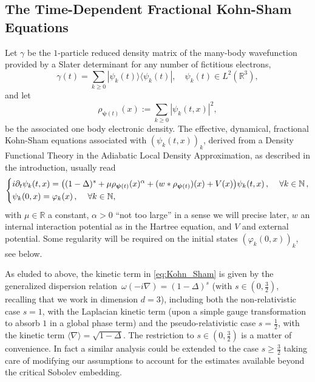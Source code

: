 \documentclass[12pt,a4paper]{amsart}
\numberwithin{equation}{section}
\newcommand{\ulpsi}{\boldsymbol{\psi}}
\begin{document}
	
	\subsection{The Time-Dependent Fractional Kohn-Sham Equations}
	
	Let $\gamma$  be the $1$-particle reduced density matrix of the many-body wavefunction provided by a Slater determinant for any number of fictitious electrons,
	\begin{equation}\label{def:density_matrix}
		\gamma(t) = \sum_{k \geq 0} | \psi_k(t) \rangle \langle \psi_k(t) | , \;\ \;\ \psi_k (t) \in L^2(\mathbb{R}^3),
	\end{equation}
	and let  %
	\begin{equation}\label{def:density}
		\rho_{\ulpsi(t)}(x) := \sum_{k \geq 0} | \psi_{k}(t,x) |^2 ,
	\end{equation}
	be the associated one body electronic density. The effective, dynamical, fractional Kohn-Sham equations associated with $(\psi_k(t,x))_k$, derived from a Density Functional Theory in the Adiabatic Local Density Approximation, as described in the introduction, usually read
	\begin{equation}
		\label{eq:Kohn_Sham}
		\begin{dcases}
			i \partial_t \psi_{k}(t,x) = \big((1- \Delta)^s  + \mu \rho_{\ulpsi(t)}(x)^\alpha +(w*\rho_{\ulpsi(t)})(x) +V(x)\big) \psi_{k}(t,x) \, , \quad \, \forall k \in \mathbb{N}\, ,\\
			\psi_k(0,x) = \varphi_k(x)\,,\, \quad\forall k \in \mathbb{N},
		\end{dcases}
	\end{equation}
	with $\mu\in\mathbb{R}$ a constant, $\alpha>0$ ``not too large'' in a sense we will precise later, $w$ an internal interaction potential as in the Hartree equation, and $V$ and external potential. Some regularity will be required on the initial states $(\varphi_k(0,x))_k$, see below.
	
	As eluded to above, the kinetic term in \eqref{eq:Kohn_Sham} is given by the generalized dispersion relation~$ \omega(-i \nabla) = (1-\Delta)^{s} $ (with $s\in(0,\frac{3}{2})$, recalling that we work in dimension $d=3$), including both the non-relativistic case $s=1$, with the Laplacian kinetic term (upon a simple gauge transformation to absorb $1$ in a global phase term) and the pseudo-relativistic case $s=\frac12$, with the kinetic term $ \langle \nabla \rangle =\sqrt{1-\Delta}$. The restriction to $s \in (0,\tfrac{3}{2})$ is a matter of convenience. In fact a similar analysis could be extended to the case $s \geq \frac{3}{2}$ taking care of modifying our assumptions to account for the estimates available beyond the critical Sobolev embedding.
	
\end{document}
